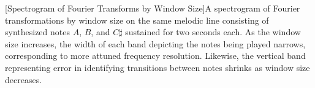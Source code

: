 [Spectrogram of Fourier Transforms by Window Size]A spectrogram of Fourier transformations by window size on the same melodic line consisting of synthesized notes $A$, $B$, and $C\sharp$ sustained for two seconds each. As the window size increases, the width of each band depicting the notes being played narrows, corresponding to more attuned frequency resolution. Likewise, the vertical band representing error in identifying transitions between notes shrinks as window size decreases.